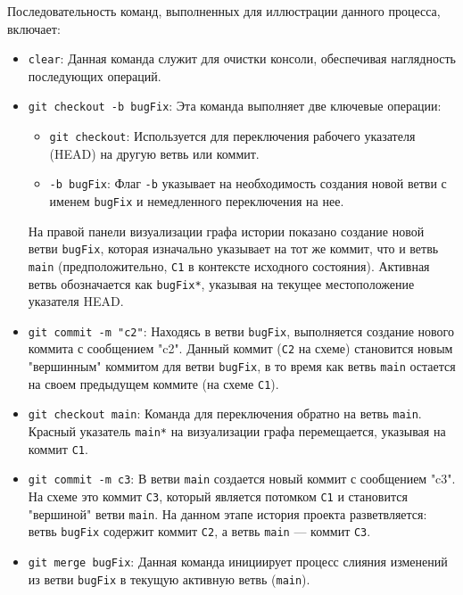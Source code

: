 \label{fig:lgb_branch}

Последовательность команд, выполненных для иллюстрации данного процесса, включает:
\begin{itemize}
    \item \texttt{clear}: Данная команда служит для очистки консоли, обеспечивая наглядность последующих операций.
    \item \texttt{git checkout -b bugFix}: Эта команда выполняет две ключевые операции:
    \begin{itemize}
        \item \texttt{git checkout}: Используется для переключения рабочего указателя (HEAD) на другую ветвь или коммит.
        \item \texttt{-b bugFix}: Флаг \texttt{-b} указывает на необходимость создания новой ветви с именем \texttt{bugFix} и немедленного переключения на нее.
    \end{itemize}
    На правой панели визуализации графа истории показано создание новой ветви \texttt{bugFix}, которая изначально указывает на тот же коммит, что и ветвь \texttt{main} (предположительно, \texttt{C1} в контексте исходного состояния).
    Активная ветвь обозначается как \texttt{bugFix*}, указывая на текущее местоположение указателя HEAD\@.
    \item \texttt{git commit -m "c2"}: Находясь в ветви \texttt{bugFix}, выполняется создание нового коммита с сообщением "c2".
    Данный коммит (\texttt{C2} на схеме) становится новым "вершинным" коммитом для ветви \texttt{bugFix}, в то время как ветвь \texttt{main} остается на своем предыдущем коммите (на схеме \texttt{C1}).
    \item \texttt{git checkout main}: Команда для переключения обратно на ветвь \texttt{main}.
    Красный указатель \texttt{main*} на визуализации графа перемещается, указывая на коммит \texttt{C1}.
    \item \texttt{git commit -m c3}: В ветви \texttt{main} создается новый коммит с сообщением "c3".
    На схеме это коммит \texttt{C3}, который является потомком \texttt{C1} и становится "вершиной" ветви \texttt{main}.
    На данном этапе история проекта разветвляется: ветвь \texttt{bugFix} содержит коммит \texttt{C2}, а ветвь \texttt{main} — коммит \texttt{C3}.
    \item \texttt{git merge bugFix}: Данная команда инициирует процесс слияния изменений из ветви \texttt{bugFix} в текущую активную ветвь (\texttt{main}).
    \begin{itemize}

\end{itemize}
\end{itemize}
